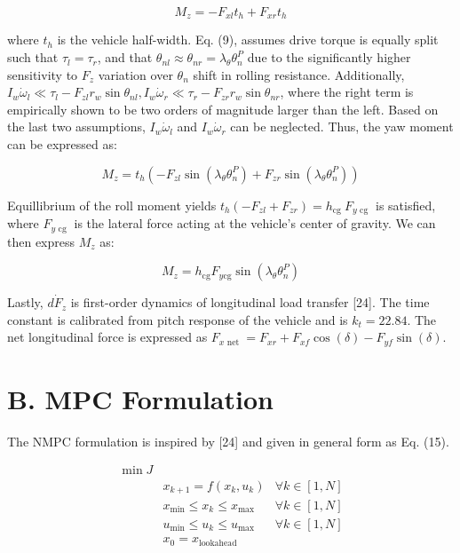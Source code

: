 \documentclass[10pt]{article}
\begin{document}
\begin{equation*}
M_{z}=-F_{x l} t_{h}+F_{x r} t_{h} \tag{12}
\end{equation*}


where $t_{h}$ is the vehicle half-width. Eq. (9), assumes drive torque is equally split such that $\tau_{l}=\tau_{r}$, and that $\theta_{n l} \approx \theta_{n r}=\lambda_{\theta} \theta_{n}^{P}$ due to the significantly higher sensitivity to $F_{z}$ variation over $\theta_{n}$ shift in rolling resistance. Additionally, $I_{w} \dot{\omega}_{l} \ll \tau_{l}-F_{z l} r_{w} \sin \theta_{n l}, I_{w} \dot{\omega}_{r} \ll \tau_{r}-F_{z r} r_{w} \sin \theta_{n r}$, where the right term is empirically shown to be two orders of magnitude larger than the left. Based on the last two assumptions, $I_{w} \dot{\omega}_{l}$ and $I_{w} \dot{\omega}_{r}$ can be neglected. Thus, the yaw moment can be expressed as:


\begin{equation*}
M_{z}=t_{h}\left(-F_{z l} \sin \left(\lambda_{\theta} \theta_{n}^{P}\right)+F_{z r} \sin \left(\lambda_{\theta} \theta_{n}^{P}\right)\right) \tag{13}
\end{equation*}


Equillibrium of the roll moment yields $t_{h}\left(-F_{z l}+F_{z r}\right)= h_{\text {cg }} F_{y \text { cg }}$ is satisfied, where $F_{y \text { cg }}$ is the lateral force acting at the vehicle's center of gravity. We can then express $M_{z}$ as:


\begin{equation*}
M_{z}=h_{\mathrm{cg}} F_{y \mathrm{cg}} \sin \left(\lambda_{\theta} \theta_{n}^{P}\right) \tag{14}
\end{equation*}


Lastly, $d \dot{F}_{z}$ is first-order dynamics of longitudinal load transfer [24]. The time constant is calibrated from pitch response of the vehicle and is $k_{t}=22.84$. The net longitudinal force is expressed as $F_{x \text { net }}=F_{x r}+F_{x f} \cos (\delta)-F_{y f} \sin (\delta)$.

\section*{B. MPC Formulation}
The NMPC formulation is inspired by [24] and given in general form as Eq. (15).

\[
\begin{array}{lll}
\min J & & \\
& x_{k+1}=f\left(x_{k}, u_{k}\right) & \forall k \in[1, N] \\
& x_{\min } \leq x_{k} \leq x_{\max } & \forall k \in[1, N]  \tag{15}\\
& u_{\min } \leq u_{k} \leq u_{\max } & \forall k \in[1, N] \\
& x_{0}=x_{\text {lookahead }} &
\end{array}
\]
\end{document}

